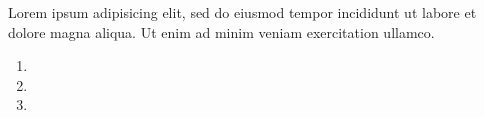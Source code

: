 \documentclass{article}
\begin{document}
Lorem ipsum  adipisicing elit,
sed do eiusmod tempor incididunt ut labore et dolore magna aliqua. Ut
enim ad minim veniam exercitation ullamco.

\begin{enumerate}
\item {}
\item {}
\item {}
\end{enumerate}
\end{document}
